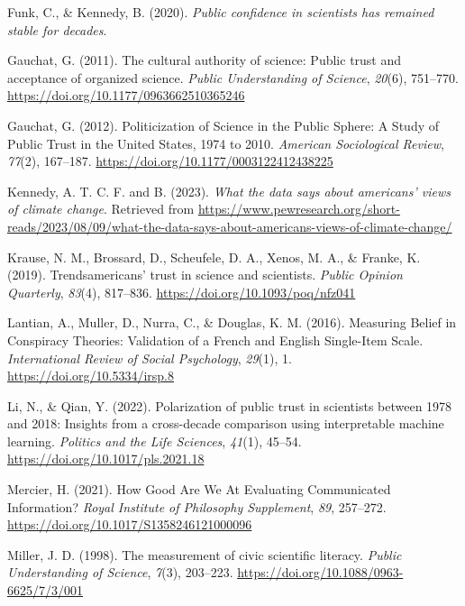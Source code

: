 \documentclass[
  doc,floatsintext]{apa6}
\newlength{\cslhangindent}
\newenvironment{CSLReferences}[2] %
 {\begin{list}{}{%
  \setlength{\itemindent}{0pt}
  \setlength{\leftmargin}{0pt}
  \setlength{\parsep}{0pt}
  \ifodd #1
   \setlength{\leftmargin}{\cslhangindent}
   \setlength{\itemindent}{-1\cslhangindent}
  \fi
  \setlength{\itemsep}{#2\baselineskip}}}
 {\end{list}}
\begin{document}
\begin{CSLReferences}{1}{0}
Funk, C., \& Kennedy, B. (2020). \emph{Public confidence in scientists has remained stable for decades}.

Gauchat, G. (2011). The cultural authority of science: Public trust and acceptance of organized science. \emph{Public Understanding of Science}, \emph{20}(6), 751--770. \url{https://doi.org/10.1177/0963662510365246}

Gauchat, G. (2012). Politicization of Science in the Public Sphere: A Study of Public Trust in the United States, 1974 to 2010. \emph{American Sociological Review}, \emph{77}(2), 167--187. \url{https://doi.org/10.1177/0003122412438225}

Kennedy, A. T. C. F. and B. (2023). \emph{What the data says about americans{'} views of climate change}. Retrieved from \url{https://www.pewresearch.org/short-reads/2023/08/09/what-the-data-says-about-americans-views-of-climate-change/}

Krause, N. M., Brossard, D., Scheufele, D. A., Xenos, M. A., \& Franke, K. (2019). Trends{\textemdash}americans{'} trust in science and scientists. \emph{Public Opinion Quarterly}, \emph{83}(4), 817--836. \url{https://doi.org/10.1093/poq/nfz041}

Lantian, A., Muller, D., Nurra, C., \& Douglas, K. M. (2016). Measuring Belief in Conspiracy Theories: Validation of a French and English Single-Item Scale. \emph{International Review of Social Psychology}, \emph{29}(1), 1. \url{https://doi.org/10.5334/irsp.8}

Li, N., \& Qian, Y. (2022). Polarization of public trust in scientists between 1978 and 2018: Insights from a cross-decade comparison using interpretable machine learning. \emph{Politics and the Life Sciences}, \emph{41}(1), 45--54. \url{https://doi.org/10.1017/pls.2021.18}

Mercier, H. (2021). How Good Are We At Evaluating Communicated Information? \emph{Royal Institute of Philosophy Supplement}, \emph{89}, 257--272. \url{https://doi.org/10.1017/S1358246121000096}

Miller, J. D. (1998). The measurement of civic scientific literacy. \emph{Public Understanding of Science}, \emph{7}(3), 203--223. \url{https://doi.org/10.1088/0963-6625/7/3/001}


\end{CSLReferences}
\end{document}
